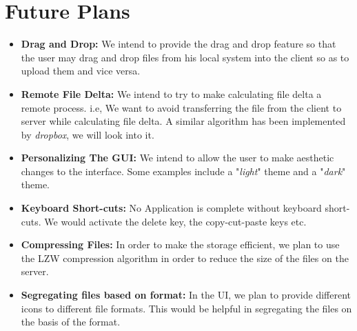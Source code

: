 \documentclass[]{article}
\begin{document}
\section{\LARGE Future Plans}

\begin{itemize}
\item \textbf{Drag and Drop:} 
We intend to provide the drag and drop feature so that the user may drag and drop files from his local system into the client so as to upload them and vice versa.
\item \textbf{Remote File Delta:}
We intend to try to make calculating file delta a remote process. i.e, We want to avoid transferring the file from the client to server while calculating file delta. A similar algorithm has been implemented by \textit{dropbox}, we will look into it.
\item \textbf{Personalizing The GUI:}
We intend to allow the user to make aesthetic changes to the interface. Some examples include a "\textit{light}" theme and a "\textit{dark}" theme.
\item \textbf{Keyboard Short-cuts:}
No Application is complete without keyboard short-cuts. We would activate the delete key, the copy-cut-paste keys etc.
\item \textbf{Compressing Files:}
In order to make the storage efficient, we plan to use the LZW compression algorithm in order to reduce the size of the files on the server.
\item \textbf{Segregating files based on format:}
In the UI, we plan to provide different icons to different file formats. This would be helpful in segregating the files on the basis of the format. 
\end{itemize}
\end{document}
